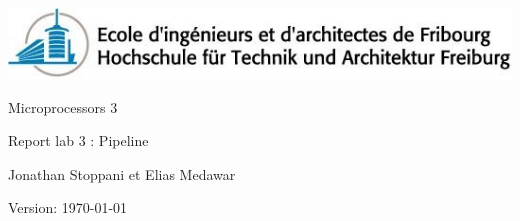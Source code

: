 \begin{titlepage}
	

		
	\addtolength{\leftskip}{-1cm}\addtolength{\rightskip}{-3.5cm}
	\vfill
	
	\hspace{0.10cm}	\includegraphics{./images/model/eifr-logo.jpg} 

	\vfill
	\hspace{8.99cm}\Huge Microprocessors  3 
	
	\hspace{9.08cm}\LARGE Report lab 3 : Pipeline
	      
	\vfill
	\Large
	
	\hspace{9.08cm}  Jonathan Stoppani et Elias Medawar
	
	\vfill
	\hspace{9.08cm}\normalsize Version:  \today
	\vfill
	\thispagestyle{empty}
	\clearpage

\end{titlepage}
